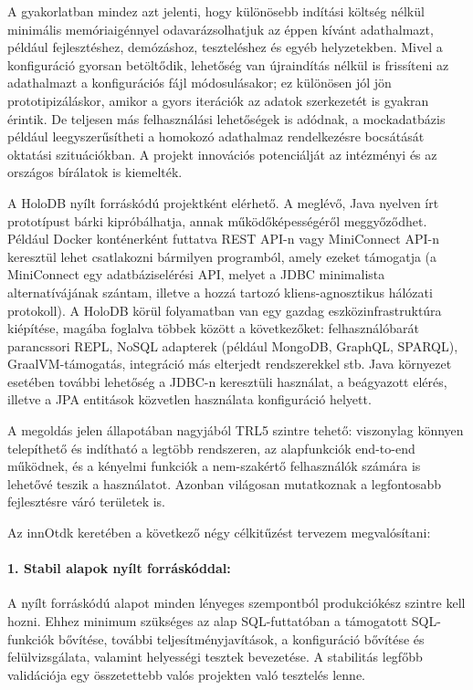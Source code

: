 \documentclass[12pt]{article}
\begin{document}
A gyakorlatban mindez azt jelenti, hogy különösebb indítási költség nélkül minimális memóriaigénnyel odavarázsolhatjuk az éppen kívánt adathalmazt, például fejlesztéshez, demózáshoz, teszteléshez és egyéb helyzetekben.
Mivel a konfiguráció gyorsan betöltődik, lehetőség van újraindítás nélkül is frissíteni az adathalmazt a konfigurációs fájl módosulásakor; ez különösen jól jön prototipizáláskor, amikor a gyors iterációk az adatok szerkezetét is gyakran érintik.
De teljesen más felhasználási lehetőségek is adódnak, a mockadatbázis például leegyszerűsítheti a homokozó adathalmaz rendelkezésre bocsátását oktatási szituációkban.
A projekt innovációs potenciálját az intézményi és az országos bírálatok is kiemelték.

A HoloDB nyílt forráskódú projektként elérhető.
A meglévő, Java nyelven írt prototípust bárki kipróbálhatja, annak működőképességéről meggyőződhet.
Például Docker konténerként futtatva REST API-n vagy MiniConnect API-n keresztül lehet csatlakozni bármilyen programból, amely ezeket támogatja
(a MiniConnect egy adatbáziselérési API, melyet a JDBC minimalista alternatívájának szántam, illetve a hozzá tartozó kliens-agnosztikus hálózati protokoll).
A HoloDB körül folyamatban van egy gazdag eszközinfrastruktúra kiépítése, magába foglalva többek között a következőket: felhasználóbarát parancssori REPL, NoSQL adapterek (például MongoDB, GraphQL, SPARQL), GraalVM-támogatás, integráció más elterjedt rendszerekkel stb.
Java környezet esetében további lehetőség a JDBC-n keresztüli használat,
a beágyazott elérés, illetve a JPA entitások közvetlen használata konfiguráció helyett.

A megoldás jelen állapotában nagyjából TRL5 szintre tehető:
viszonylag könnyen telepíthető és indítható a legtöbb rendszeren,
az alapfunkciók end-to-end működnek,
és a kényelmi funkciók a nem-szakértő felhasználók számára is lehetővé teszik a használatot.
Azonban világosan mutatkoznak a legfontosabb fejlesztésre váró területek is.

Az innOtdk keretében a következő négy célkitűzést tervezem megvalósítani:

\paragraph{1. Stabil alapok nyílt forráskóddal:}{
A nyílt forráskódú alapot minden lényeges szempontból produkciókész szintre kell hozni.
Ehhez minimum szükséges az alap SQL-futtatóban a támogatott SQL-funkciók bővítése,
további teljesítményjavítások,
a konfiguráció bővítése és felülvizsgálata,
valamint helyességi tesztek bevezetése.
A stabilitás legfőbb validációja egy összetettebb valós projekten való tesztelés lenne.
}
\end{document}
